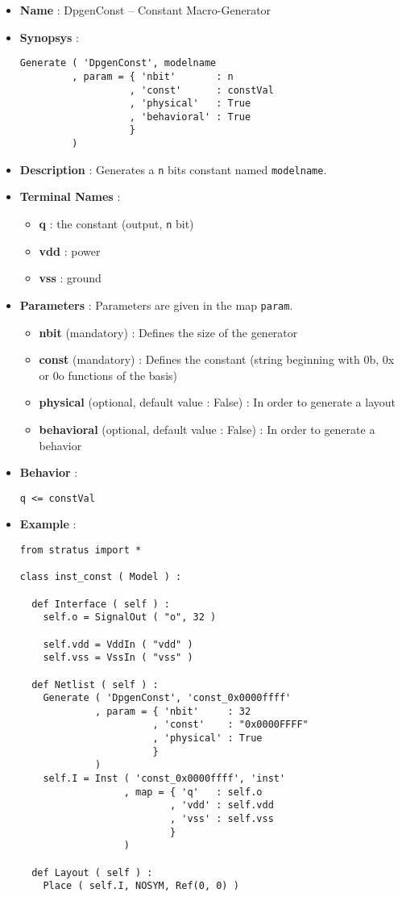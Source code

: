 \begin{itemize}
    \item \textbf{Name} : DpgenConst -- Constant Macro-Generator
    \item \textbf{Synopsys} :
\begin{verbatim}
Generate ( 'DpgenConst', modelname
         , param = { 'nbit'       : n
                   , 'const'      : constVal
                   , 'physical'   : True
                   , 'behavioral' : True                   
                   }
         )
\end{verbatim}
    \item \textbf{Description} : Generates a \verb-n- bits constant named \verb-modelname-.
    \item \textbf{Terminal Names} :
    \begin{itemize}
        \item \textbf{q} : the constant (output, \verb-n- bit)
        \item \textbf{vdd} : power
        \item \textbf{vss} : ground
    \end{itemize}
    \item \textbf{Parameters} : Parameters are given in the map \verb-param-.
    \begin{itemize}
        \item \textbf{nbit } (mandatory) : Defines the size of the generator
        \item \textbf{const} (mandatory) : Defines the constant (string beginning with 0b, 0x or 0o functions of the basis)
        \item \textbf{physical} (optional, default value : False) : In order to generate a layout
        \item \textbf{behavioral} (optional, default value : False) : In order to generate a behavior
    \end{itemize}
    \item \textbf{Behavior} :
\begin{verbatim}
q <= constVal
\end{verbatim}
    \item \textbf{Example} :
\begin{verbatim}
from stratus import *

class inst_const ( Model ) :

  def Interface ( self ) :
    self.o = SignalOut ( "o", 32 )

    self.vdd = VddIn ( "vdd" )
    self.vss = VssIn ( "vss" )
    
  def Netlist ( self ) :
    Generate ( 'DpgenConst', 'const_0x0000ffff'
             , param = { 'nbit'     : 32
                       , 'const'    : "0x0000FFFF"
                       , 'physical' : True
                       }
             )      
    self.I = Inst ( 'const_0x0000ffff', 'inst'
                  , map = { 'q'   : self.o
                          , 'vdd' : self.vdd
                          , 'vss' : self.vss
                          }
                  )
      
  def Layout ( self ) :
    Place ( self.I, NOSYM, Ref(0, 0) )
\end{verbatim}
\end{itemize}
